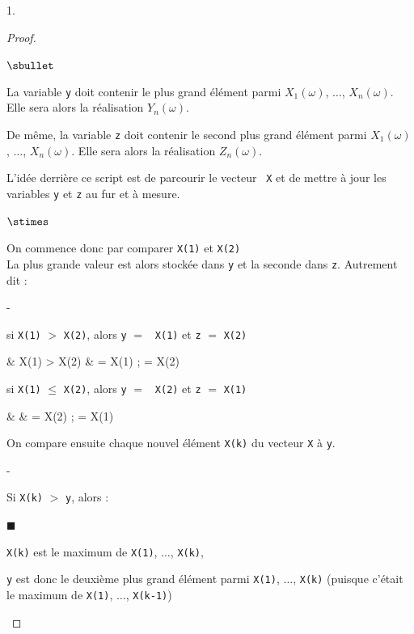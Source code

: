 \begin{noliste}{1.}
\begin{proof}
\begin{noliste}{$\sbullet$}
      \item La variable {\tt y} doit contenir le plus grand 
      élément parmi $X_1(\omega)$, $\ldots$, $X_n(\omega)$. Elle 
      sera alors la réalisation $Y_n(\omega)$.
      
      \item De même, la variable {\tt z} doit contenir le second plus 
      grand élément parmi $X_1(\omega)$, $\ldots$, $X_n(\omega)$.
      Elle sera alors la réalisation $Z_n(\omega)$.
      
      \item L'idée derrière ce script est de parcourir le vecteur {\tt 
      X}
      et de mettre à jour les variables {\tt y} et {\tt z} au fur et 
      à mesure.
      \begin{noliste}{$\stimes$}
	\item On commence donc par comparer {\tt X(1)} et {\tt X(2)}\\
	La plus grande valeur est alors stockée dans {\tt y} et la 
	seconde dans {\tt z}. Autrement dit :
	\begin{noliste}{-}
	  \item si {\tt X(1)} $>$ {\tt X(2)}, alors {\tt y} $=$ {\tt
	  X(1)} et {\tt z} $=$ {\tt X(2)}
	  \begin{scilabC}{2}
	    & \quad {} X(1) > X(2) \nl %
	    & \quad \quad {} = X(1) ;  = X(2)
	  \end{scilabC}
	  
	  \item si {\tt X(1)} $\leq$ {\tt X(2)}, alors {\tt y} $=$ {\tt
	  X(2)} et {\tt z} $=$ {\tt X(1)}
	  \begin{scilabC}{4}
	    & \quad {} \nl %
	    & \quad \quad {} = X(2) ;  = X(1)
	  \end{scilabC}
	\end{noliste}
	
	\item On compare ensuite chaque nouvel élément {\tt X(k)} 
	du vecteur {\tt X} à {\tt y}.
	\begin{noliste}{-}
	  \item Si {\tt X(k)} $>$ {\tt y}, alors :
	\end{noliste}
	  \begin{liste}{\tiny$\blacksquare$}
	    \item {\tt X(k)} est le maximum de {\tt X(1)}, $\ldots$,
	    {\tt X(k)},
	    
	    \item {\tt y} est donc le deuxième plus grand élément 
	    parmi {\tt X(1)}, $\ldots$, {\tt X(k)} (puisque c'était 
	    le maximum de {\tt X(1)}, $\ldots$, {\tt X(k-1)})
	    

\end{liste}
\end{noliste}
\end{noliste}
\end{proof}
\end{noliste}
